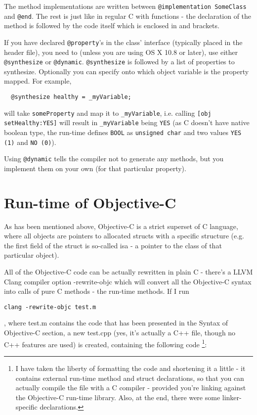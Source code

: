 \documentclass[a4paper, 11pt, fleqn]{book}
\begin{document}
The method implementations are written between \verb=@implementation SomeClass= and \verb=@end=. The rest is just like in regular C with functions - the declaration of the method is followed by the code itself which is enclosed in { and } brackets.

If you have declared \verb=@property='s in the class' interface (typically placed in the header file), you need to (unless you are using OS X 10.8 or later), use either \verb=@synthesize= or \verb=@dynamic=. \verb=@synthesize= is followed by a list of properties to synthesize. Optionally you can specify onto which object variable is the property mapped. For example,

\begin{verbatim}
  @synthesize healthy = _myVariable;
\end{verbatim}

will take \verb=someProperty= and map it to \verb=_myVariable=, i.e. calling \verb=[obj setHealthy:YES]= will result in \verb=_myVariable= being \verb=YES= (as C doesn't have native boolean type, the run-time defines \verb=BOOL= as \verb=unsigned char= and two values \verb=YES (1)= and \verb=NO (0)=).

Using \verb=@dynamic= tells the compiler not to generate any methods, but you implement them on your own (for that particular property).


\section{Run-time of Objective-C}

As has been mentioned above, Objective-C is a strict superset of C language, where all objects are pointers to allocated structs with a specific structure (e.g. the first field of the struct is so-called isa - a pointer to the class of that particular object).
  
All of the Objective-C code can be actually rewritten in plain C - there's a LLVM Clang compiler option -rewrite-objc which will convert all the Objective-C syntax into calls of pure C methods - the run-time methods. If I run \begin{verbatim}clang -rewrite-objc test.m\end{verbatim}, where test.m contains the code that has been presented in the Syntax of Objective-C section, a new test.cpp (yes, it's actually a C++ file, though no C++ features are used) is created, containing the following code \footnote{I have taken the liberty of formatting the code and shortening it a little - it contains external run-time method and struct declarations, so that you can actually compile the file with a C compiler - provided you're linking against the Objective-C run-time library. Also, at the end, there were some linker-specific declarations.}:
\end{document}
